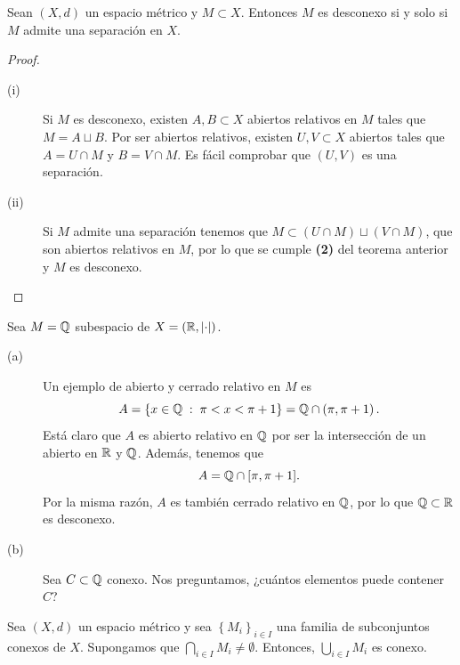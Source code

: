 \begin{theorem}
Sean $\displaystyle \left(X,d\right) $ un espacio métrico y $\displaystyle M \subset X $. Entonces $\displaystyle M $ es desconexo si y solo si $\displaystyle M $ admite una separación en $\displaystyle X $.
\end{theorem}
\begin{proof}
\begin{description}
\item[(i)] Si $\displaystyle M $ es desconexo, existen $\displaystyle A,B \subset X $ abiertos relativos en $\displaystyle M $ tales que $\displaystyle M = A \sqcup B$. Por ser abiertos relativos, existen $\displaystyle U,V \subset X $ abiertos tales que $\displaystyle A = U \cap M $ y $\displaystyle B = V \cap M $. Es fácil comprobar que $\displaystyle \left(U,V\right) $ es una separación.
\item[(ii)] Si $\displaystyle M $ admite una separación tenemos que $\displaystyle M \subset \left(U \cap M\right) \sqcup \left(V \cap M\right)$, que son abiertos relativos en $\displaystyle M $, por lo que se cumple \textbf{(2)} del teorema anterior y $\displaystyle M $ es desconexo.
\end{description}
\end{proof}
\begin{eg}
Sea $\displaystyle M = \mathbb{Q} $ subespacio de $\displaystyle X = \left(\mathbb{R}, \left| \cdot\right|\right) $. 
\begin{description}
\item[(a)] Un ejemplo de abierto y cerrado relativo en $\displaystyle M $ es
	\[A = \left\{ x \in \mathbb{Q} \; : \; \pi < x < \pi+1\right\}  = \mathbb{Q} \cap \left(\pi , \pi + 1\right) .\]
Está claro que $\displaystyle A $ es abierto relativo en $\displaystyle \mathbb{Q} $ por ser la intersección de un abierto en $\displaystyle \mathbb{R} $ y $\displaystyle \mathbb{Q} $. Además, tenemos que
\[A = \mathbb{Q} \cap [\pi , \pi + 1] .\]
Por la misma razón, $\displaystyle A $ es también cerrado relativo en $\displaystyle \mathbb{Q} $, por lo que $\displaystyle \mathbb{Q} \subset \mathbb{R} $ es desconexo. 
\item[(b)] Sea $\displaystyle C \subset\mathbb{Q} $ conexo. Nos preguntamos, ¿cuántos elementos puede contener $\displaystyle C $? 
\end{description}
\end{eg}
\begin{lema}
	Sea $\displaystyle \left(X,d\right) $ un espacio métrico y sea $\displaystyle \left\{ M_{i}\right\} _{i\in I} $ una familia de subconjuntos conexos de $\displaystyle X $. Supongamos que $\displaystyle \bigcap_{i \in I}M_{i} \neq \emptyset $. Entonces, $\displaystyle \bigcup_{i \in I}M_{i} $ es conexo.
\end{lema}
